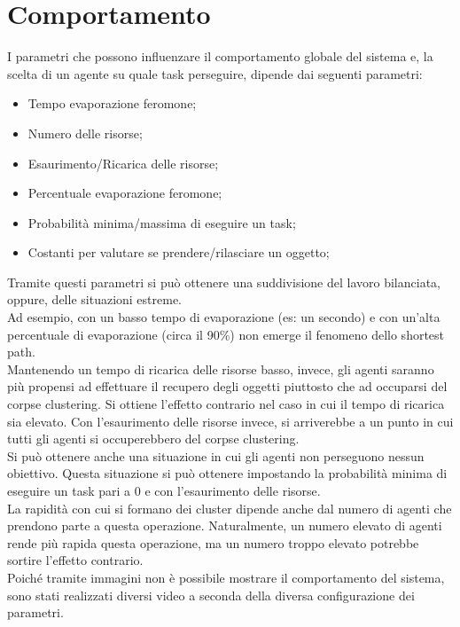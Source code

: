 \documentclass[12pt,a4paper,openright,twoside]{report}
\begin{document}
\clearpage{\pagestyle{empty}\cleardoublepage}
\chapter{Comportamento}                %
\lhead[\fancyplain{}{\bfseries\thepage}]{\fancyplain{}{\bfseries\rightmark}}

I parametri che possono influenzare il comportamento globale del sistema e, la scelta di un agente su quale task perseguire, dipende dai seguenti parametri:\\

\begin{itemize}
	\item Tempo evaporazione feromone;
	\item Numero delle risorse;
	\item Esaurimento/Ricarica delle risorse;
	\item Percentuale evaporazione feromone;
	\item Probabilità minima/massima di eseguire un task;
	\item Costanti per valutare se prendere/rilasciare un oggetto;
\end{itemize}

Tramite questi parametri si può ottenere una suddivisione del lavoro bilanciata, oppure, delle situazioni estreme.\\
Ad esempio, con un basso tempo di evaporazione (es: un secondo) e con un'alta percentuale di evaporazione (circa il 90\%) non emerge il fenomeno dello shortest path.\\
Mantenendo un tempo di ricarica delle risorse basso, invece, gli agenti saranno più propensi ad effettuare il recupero degli oggetti piuttosto che ad occuparsi del corpse clustering. Si ottiene l'effetto contrario nel caso in cui il tempo di ricarica sia elevato. Con l'esaurimento delle risorse invece, si arriverebbe a un punto in cui tutti gli agenti si occuperebbero del corpse clustering.\\
Si può ottenere anche una situazione in cui gli agenti non perseguono nessun obiettivo. Questa situazione si può ottenere impostando la probabilità minima di eseguire un task pari a 0 e con l'esaurimento delle risorse.\\
La rapidità con cui si formano dei cluster dipende anche dal numero di agenti che prendono parte a questa operazione. Naturalmente, un numero elevato di agenti rende più rapida questa operazione, ma un numero troppo elevato potrebbe sortire l'effetto contrario.\\
Poiché tramite immagini non è possibile mostrare il comportamento del sistema, sono stati realizzati diversi video a seconda della diversa configurazione dei parametri.
\end{document}
